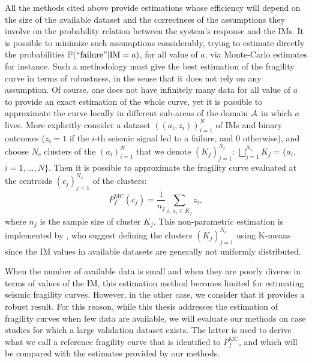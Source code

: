 All the methods cited above provide estimations whose efficiency will depend on the size of the available dataset and the correctness of the assumptions they involve on the probability relation between the system's response and the IMs.
It is possible to minimize such assumptions considerably, trying to estimate directly the probabilities $\mathbb{P}(\text{``failure''}|\text{IM}=a)$, for all value of $a$, via Monte-Carlo estimates for instance.
Such a methodology must give the best estimation of the fragility curve in terms of robustness, in the sense that it does not rely on any assumption. Of course, one does not have infinitely many data for all value of $a$ to provide an exact estimation of the whole curve, yet it is possible to approximate the curve locally in different sub-areas of the domain $\mathcal{A}$ in which $a$ lives.
More explicitly consider a dataset $((a_i,z_i))_{i=1}^{N}$ of IMs and binary outcomes ($z_i=1$ if the $i$-th seismic signal led to a failure, and $0$ otherwise), and choose $N_c$ clusters of the $(a_i)_{i=1}^N$ that we denote $(K_j)_{j=1}^{N_c}$: $\bigsqcup_{j=1}^{N_c}K_j=\{a_i,$ $i=1,\dots,N\}$. Then it is possible to approximate the fragility curve evaluated at the centroids $(c_j)_{j=1}^{N_c}$ of the clusters:
    \begin{equation}
        P_f^{\text{MC}}(c_j) = \frac{1}{n_j}\sum_{i,\, a_i\in K_j}z_i,
    \end{equation}
where $n_j$ is the sample size of cluster $K_j$.
This non-parametric estimation is implemented by \citet{trevlopoulos_parametric_2019}, who suggest defining the clusters $(K_j)_{j=1}^{N_c}$ using K-means since the IM values in available datasets are generally not uniformly distributed.

When the number of available data is small and when they are poorly diverse in terms of values of the IM, this estimation method becomes limited for estimating seismic fragility curves. However, in the other case, we consider that it provides a robust result. %
For this reason, while this thesis addresses the estimation of fragility curves when few data are available, we will evaluate our methods on case studies for which a large validation dataset exists.
The latter is used to derive what we call a reference fragility curve that is identified to $P^{\text{MC}}_f$, and which will be compared with the estimates provided by our methods.






